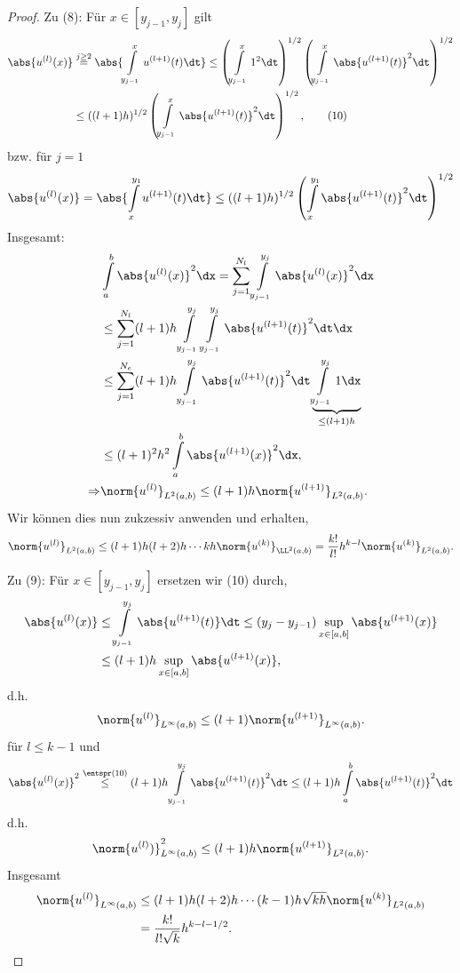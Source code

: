 \begin{proof}
Zu (8): Für $x\in [y_{j-1},y_j]$ gilt
\begin{align*}
\abs{u^{(l)}(x)} &\overset{j\ge 2}{=} \abs{\int\limits_{y_{j-1}}^x
u^{(l+1)}(t)\dt} \le  \left(\int\limits_{y_{j-1}}^x 1^2\dt\right)^{1/2} \left(
\int\limits_{y_{j-1}}^x
\abs{u^{(l+1)}(t)}^2\dt \right)^{1/2}\\
&\le ((l+1)h)^{1/2}\left(\int\limits_{y_{j-1}}^x
\abs{u^{(l+1)}(t)}^2\dt \right)^{1/2},\tag{10}
\end{align*}
bzw. für $j=1$
\begin{align*}
\abs{u^{(l)}(x)} = \abs{\int\limits_x^{y_1} u^{(l+1)}(t)\dt } \le
((l+1)h)^{1/2}\left(\int\limits_{x}^{y_1}
\abs{u^{(l+1)}(t)}^2\dt \right)^{1/2}
\end{align*}
Insgesamt:
\begin{align*}
&\int\limits_a^b \abs{u^{(l)}(x)}^2\dx = \sum\limits_{j=1}^{N_l}
\int\limits_{y_{j-1}}^{y_j} \abs{u^{(l)}(x)}^2 \dx\\
&\le \sum\limits_{j=1}^{N_l}
(l+1)h \int\limits_{y_{j-1}}^{y_j} \int\limits_{y_{j-1}}^{y_j}
\abs{u^{(l+1)}(t)}^2 \dt\dx\\ & \le \sum\limits_{j=1}^{N_e}
(l+1)h  \int\limits_{y_{j-1}}^{y_j} \abs{u^{(l+1)}(t)}^2
\dt\underbrace{\int\limits_{y_{j-1}}^{y_j} 1 \dx}_{\le(l+1)h}\\
&\le (l+1)^2h^2 \int\limits_{a}^b \abs{u^{(l+1)}(x)}^2\dx,\\
\Rightarrow &\norm{u^{(l)}}_{L^2(a,b)}\le (l+1)h\norm{u^{(l+1)}}_{L^2(a,b)}.
\end{align*}
Wir können dies nun zukzessiv anwenden und erhalten,
\begin{align*}
\norm{u^{(l)}}_{L^2(a,b)}\le (l+1)h(l+2)h\cdots
kh\norm{u^{(k)}}_{\LL^2(a,b)}
= \frac{k!}{l!}h^{k-l}\norm{u^{(k)}}_{L^2(a,b)}.
\end{align*}

Zu (9): Für $x\in [y_{j-1},y_j]$ ersetzen wir (10) durch,
\begin{align*}
\abs{u^{(l)}(x)} &\le \int\limits_{y_{j-1}}^{y_j} \abs{u^{(l+1)}(t)}\dt
\le (y_j-y_{j-1})\sup\limits_{x\in[a,b]} \abs{u^{(l+1)}(x)}\\
&\le (l+1)h\sup\limits_{x\in[a,b]} \abs{u^{(l+1)}(x)},
\end{align*}
d.h.
\begin{align*}
\norm{u^{(l)}}_{L^\infty(a,b)} \le (l+1)\norm{u^{(l+1)}}_{L^\infty(a,b)}.
\end{align*}
für $l\le k-1$ und
\begin{align*}
\abs{u^{(l)}(x)}^2 \overset{\entspr (10)}{\le} (l+1)h\int\limits_{y_{j-1}}^{y_j}
\abs{u^{(l+1)}(t)}^2\dt
\le (l+1)h\int\limits_a^b \abs{u^{(l+1)}(t)}^2\dt
\end{align*}
d.h.
\begin{align*}
\norm{u^{(l)})}^2_{L^\infty(a,b)}\le (l+1)h\norm{u^{(l+1)}}_{L^2(a,b)}.
\end{align*}
Insgesamt
\begin{align*}
\norm{u^{(l)}}_{L^\infty(a,b)} &\le
(l+1)h(l+2)h\cdots(k-1)h\sqrt{kh}\norm{u^{(k)}}_{L^2(a,b)}\\
&= \frac{k!}{l!\sqrt{k}}h^{k-l-1/2}.\qedhere
\end{align*}
\end{proof}

